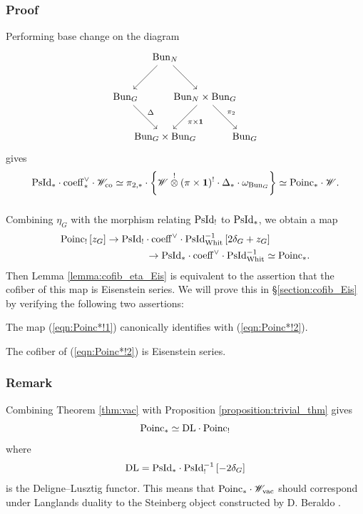 \subsubsection{Proof} Performing base change on the diagram
\[
\begin{tikzcd}[
  column sep={4em,between origins},
  row sep={4em,between origins}
]
    & \Bun_N \arrow[dl] \arrow[dr] & & \\
    \Bun_G \arrow[dr, "\Delta"] & & \Bun_N \times \Bun_G \arrow[dl, "\pi \times \id"] \arrow[dr, "\pi_2"] & \\
    & \Bun_G \times \Bun_G & & \Bun_G
\end{tikzcd}
\]
gives
\[
    \mathrm{PsId}_* \cdot \mathrm{coeff}_*^\vee \cdot \mathscr{W}_{\mathrm{co}}
    \simeq \pi_{2,*} \cdot \left\{ \mathscr{W} \overset{!}{\otimes} (\pi \times \mathbf{1})^! \cdot \Delta_* \cdot \omega_{\mathrm{Bun}_G} \right\}
    \simeq \mathrm{Poinc}_* \cdot \mathscr{W}.
\]

\subsubsection{} Combining $\eta_G$ with the morphism relating $\mathrm{PsId}_!$ to $\mathrm{PsId}_*$, we obtain a map
\begin{equation}
\label{eqn:Poinc*!1}
\begin{split}
  \mathrm{Poinc}_! \, [z_G]
  & \to \mathrm{PsId}_! \cdot \mathrm{coeff}^\vee \cdot \mathrm{PsId}_{\mathrm{Whit}}^{-1} \, [2 \delta_G + z_G] \\
  & \qquad \qquad \to \mathrm{PsId}_* \cdot \mathrm{coeff}^\vee \cdot \mathrm{PsId}_{\mathrm{Whit}}^{-1} \simeq \mathrm{Poinc}_*.
\end{split}
\end{equation}
Then Lemma \ref{lemma:cofib_eta_Eis} is equivalent to the assertion that the cofiber of this map is Eisenstein series. We will prove this in \S\ref{section:cofib_Eis} by verifying the following two assertions:

\begin{proposition}
\label{proposition:poinc_identification}
The map (\ref{eqn:Poinc*!1}) canonically identifies with (\ref{eqn:Poinc*!2}).
\end{proposition}

\begin{proposition}
\label{proposition:poinc_principal_series}
The cofiber of (\ref{eqn:Poinc*!2}) is Eisenstein series.
\end{proposition}

\subsubsection{Remark} Combining Theorem \ref{thm:vac} with Proposition \ref{proposition:trivial_thm} gives
    \[
    \mathrm{Poinc}_* \simeq \mathrm{DL} \cdot \mathrm{Poinc}_!
    \]
where
    \[\mathrm{DL} = \mathrm{PsId}_* \cdot \mathrm{PsId}_!^{-1} \, [-2\delta_G]\]
is the Deligne--Lusztig functor. This means that $\mathrm{Poinc}_* \cdot \mathscr{W}_{\mathrm{vac}}$ should correspond under Langlands duality to the Steinberg object constructed by D. Beraldo \cite{dario_DL}.

